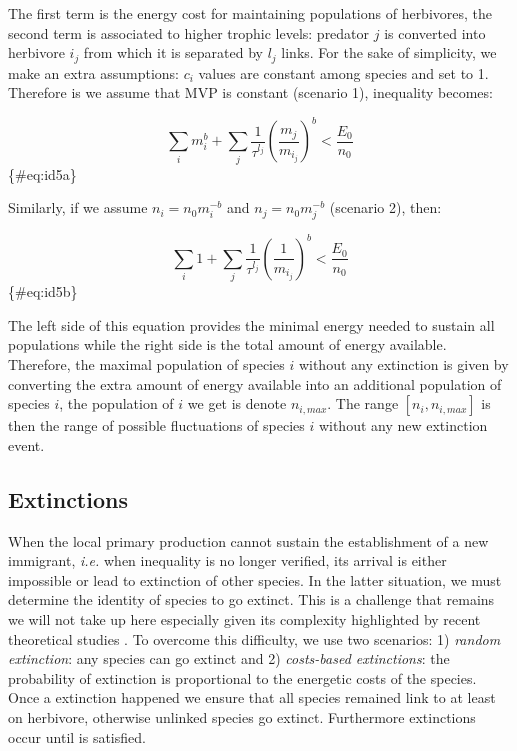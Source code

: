 The first term is the energy cost for maintaining populations of
herbivores, the second term is associated to higher trophic levels:
predator \(j\) is converted into herbivore \(i_j\) from which it is
separated by \(l_j\) links. For the sake of simplicity, we make an extra
assumptions: \(c_i\) values are constant among species and set to 1.
Therefore is we assume that MVP is constant (scenario 1), inequality
\citet{eq:id5} becomes:

\[ \sum_i m_i^b + \sum_j \frac{1}{\tau^{l_j}} \left( \frac{m_j}{m_{i_j}} \right)^b< \frac{E_0}{n_0} \]
\{\#eq:id5a\}

Similarly, if we assume \(n_i=n_0m_i^{-b}\) and \(n_j=n_0m_j^{-b}\)
(scenario 2), then:

\[ \sum_i 1 + \sum_j \frac{1}{\tau^{l_j}} \left( \frac{1}{m_{i_j}} \right)^b< \frac{E_0}{n_0} \]
\{\#eq:id5b\}

The left side of this equation provides the minimal energy needed to
sustain all populations while the right side is the total amount of
energy available. Therefore, the maximal population of species \(i\)
without any extinction is given by converting the extra amount of energy
available into an additional population of species \(i\), the population
of \(i\) we get is denote \(n_{i,max}\). The range \([n_i, n_{i, max}]\)
is then the range of possible fluctuations of species \(i\) without any
new extinction event.

\subsection{Extinctions}\label{extinctions}

When the local primary production cannot sustain the establishment of a
new immigrant, \emph{i.e.} when inequality \citet{eq:id5} is no longer
verified, its arrival is either impossible or lead to extinction of
other species. In the latter situation, we must determine the identity
of species to go extinct. This is a challenge that remains we will not
take up here especially given its complexity highlighted by recent
theoretical studies \citep{Saterberg2013, Zhao2016}. To overcome this
difficulty, we use two scenarios: 1) \emph{random extinction}: any
species can go extinct and 2) \emph{costs-based extinctions}: the
probability of extinction is proportional to the energetic costs of the
species. Once a extinction happened we ensure that all species remained
link to at least on herbivore, otherwise unlinked species go extinct.
Furthermore extinctions occur until \citet{eq:id5} is satisfied.

